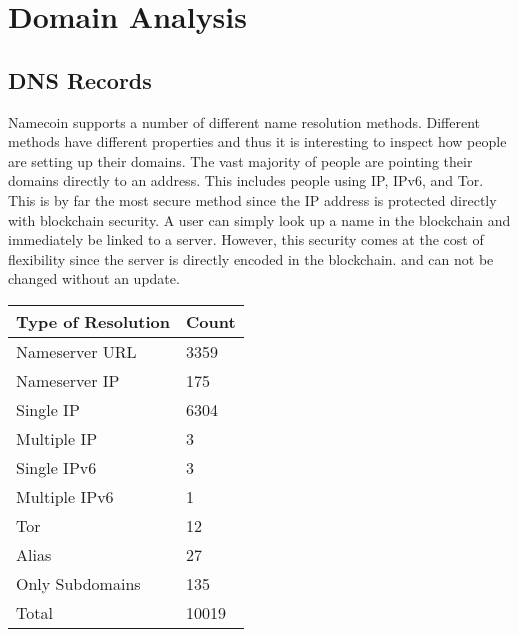 \section{Domain Analysis}

\subsection{DNS Records}


Namecoin supports a number of different name resolution methods. Different methods have different properties and thus it is interesting to inspect how people are setting up their domains. The vast majority of people are pointing their domains directly to an address. This includes people using IP, IPv6, and Tor. This is by far the most secure method since the IP address is protected directly with blockchain security. A user can simply look up a name in the blockchain and immediately be linked to a server. However, this security comes at the cost of flexibility since the server is directly encoded in the blockchain. and can not be changed without an update.

\begin{table}[t]
\begin{tabular}{ll}
Type of Resolution & Count \\ \hline
Nameserver URL     & 3359  \\
Nameserver IP      & 175   \\
Single IP          & 6304  \\
Multiple IP        & 3     \\
Single IPv6        & 3     \\
Multiple IPv6      & 1     \\
Tor                & 12    \\
Alias              & 27    \\
Only Subdomains    & 135   \\ \hline
Total              & 10019
\end{tabular}
\end{table}



